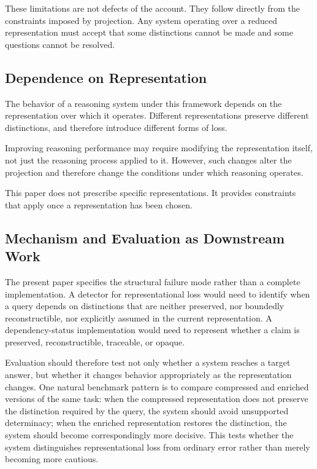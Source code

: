 \documentclass[11pt]{article}
\begin{document}
These limitations are not defects of the account. They follow directly from the constraints imposed by projection. Any system operating over a reduced representation must accept that some distinctions cannot be made and some questions cannot be resolved.

\subsection{Dependence on Representation}

The behavior of a reasoning system under this framework depends on the representation over which it operates. Different representations preserve different distinctions, and therefore introduce different forms of loss.

Improving reasoning performance may require modifying the representation itself, not just the reasoning process applied to it. However, such changes alter the projection and therefore change the conditions under which reasoning operates.

This paper does not prescribe specific representations. It provides constraints that apply once a representation has been chosen.

\subsection{Mechanism and Evaluation as Downstream Work}

The present paper specifies the structural failure mode rather than a complete implementation. A detector for representational loss would need to identify when a query depends on distinctions that are neither preserved, nor boundedly reconstructible, nor explicitly assumed in the current representation. A dependency-status implementation would need to represent whether a claim is preserved, reconstructible, traceable, or opaque.

Evaluation should therefore test not only whether a system reaches a target answer, but whether it changes behavior appropriately as the representation changes. One natural benchmark pattern is to compare compressed and enriched versions of the same task: when the compressed representation does not preserve the distinction required by the query, the system should avoid unsupported determinacy; when the enriched representation restores the distinction, the system should become correspondingly more decisive. This tests whether the system distinguishes representational loss from ordinary error rather than merely becoming more cautious.
\end{document}
